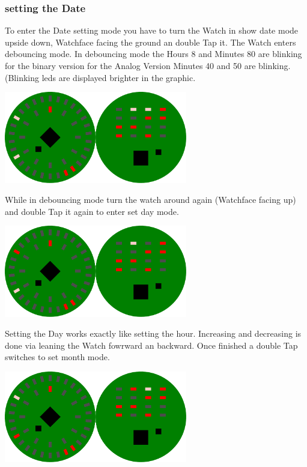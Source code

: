 \subsubsection{setting the Date}
To enter the Date setting mode you have to turn the Watch in show date mode upside down, Watchface facing the ground an double Tap it. The Watch enters debouncing mode.
In debouncing mode the Hours 8 and Minutes 80 are blinking for the binary version for the Analog Version Minutes 40 and 50 are blinking. (Blinking leds are displayed brighter in the graphic.
\begin{center}
\includegraphics[width=0.6\textwidth]{../Graphics/Date25_Dez_debouncing}
\end{center}
While in debouncing mode turn the watch around again (Watchface facing up)  and double Tap it again to enter set day mode.
\begin{center}
\includegraphics[width=0.6\textwidth]{../Graphics/Date25_Dez_SetDay}
\end{center}
Setting the Day works exactly like setting the hour. Increasing and decreasing is done via leaning the Watch fowrward an backward. Once finished a double Tap switches to set month mode.
\begin{center}
\includegraphics[width=0.6\textwidth]{../Graphics/Date25_Dez_SetMonth}
\end{center}
